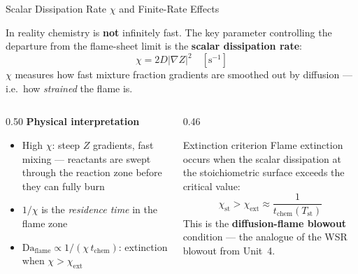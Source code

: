 \documentclass[12pt,aspectratio=169]{beamer}
\newcommand{\Da}{\mathrm{Da}}
\newcommand{\chist}{\chi_{\text{st}}}
\newcommand{\chiext}{\chi_{\text{ext}}}
\newcommand{\tchem}{t_{\text{chem}}}
\begin{document}
\begin{frame}{Scalar Dissipation Rate $\chi$ and Finite-Rate Effects}

  In reality chemistry is \textbf{not} infinitely fast.
  The key parameter controlling the departure from the flame-sheet
  limit is the \textbf{scalar dissipation rate}:
  \[
    \chi = 2D|\nabla Z|^2 \quad [\text{s}^{-1}]
  \]
  $\chi$ measures how fast mixture fraction gradients are smoothed out
  by diffusion --- i.e.\ how \emph{strained} the flame is.

  \begin{columns}[t]
    \begin{column}{0.50\textwidth}
      \textbf{Physical interpretation}
      \begin{itemize}
        \item High $\chi$: steep $Z$ gradients, fast mixing ---
              reactants are swept through the reaction zone before
              they can fully burn
        \item $1/\chi$ is the \emph{residence time} in the flame zone
        \item $\Da_{\text{flame}} \propto 1/(\chi\,\tchem)$:
              extinction when $\chi > \chiext$
      \end{itemize}
    \end{column}
    \begin{column}{0.46\textwidth}
      \begin{alertblock}{Extinction criterion}
        Flame extinction occurs when the scalar dissipation
        at the stoichiometric surface exceeds the critical value:
        \[
          \chist > \chiext \approx \frac{1}{\tchem(T_{\text{st}})}
        \]
        This is the \textbf{diffusion-flame blowout} condition ---
        the analogue of the WSR blowout from Unit~4.
      \end{alertblock}
    \end{column}
  \end{columns}
\end{frame}
\end{document}
